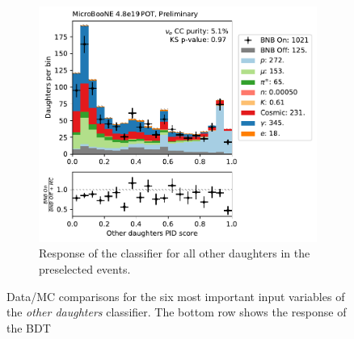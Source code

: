 \begin{figure}[htb]
\begin{center}
\begin{subfigure}{\textwidth}
    \end{subfigure}
    \begin{subfigure}{\textwidth}
    \centering
    \includegraphics[height=0.27\textheight]{NueCCsel/Images/datamc/daughters_bdt.pdf}
    \caption{\label{fig:nuecc:other_result} Response of the classifier for all other daughters in the preselected events.}
    \end{subfigure}
    \end{center}
\caption{\label{fig:nuecc:other_cand_all} Data/MC comparisons for the six most important input variables of the \textit{other daughters} classifier. The bottom row shows the response of the BDT}
\end{figure}

\clearpage

